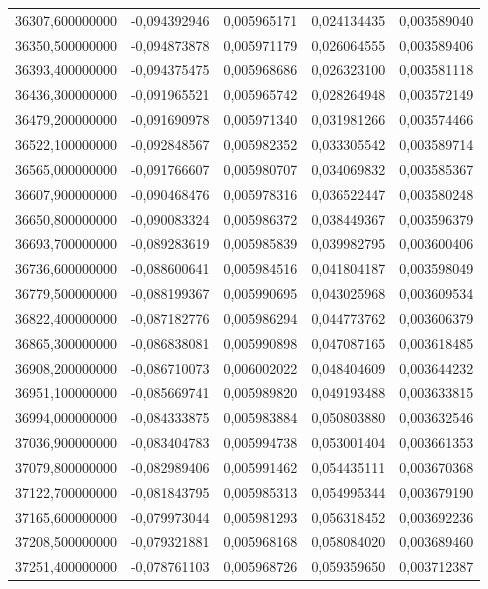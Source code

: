 \begin{longtable}{rrrrr}
36307,600000000 & -0,094392946 & 0,005965171 & 0,024134435 & 0,003589040\\
36350,500000000 & -0,094873878 & 0,005971179 & 0,026064555 & 0,003589406\\
36393,400000000 & -0,094375475 & 0,005968686 & 0,026323100 & 0,003581118\\
36436,300000000 & -0,091965521 & 0,005965742 & 0,028264948 & 0,003572149\\
36479,200000000 & -0,091690978 & 0,005971340 & 0,031981266 & 0,003574466\\
36522,100000000 & -0,092848567 & 0,005982352 & 0,033305542 & 0,003589714\\
36565,000000000 & -0,091766607 & 0,005980707 & 0,034069832 & 0,003585367\\
36607,900000000 & -0,090468476 & 0,005978316 & 0,036522447 & 0,003580248\\
36650,800000000 & -0,090083324 & 0,005986372 & 0,038449367 & 0,003596379\\
36693,700000000 & -0,089283619 & 0,005985839 & 0,039982795 & 0,003600406\\
36736,600000000 & -0,088600641 & 0,005984516 & 0,041804187 & 0,003598049\\
36779,500000000 & -0,088199367 & 0,005990695 & 0,043025968 & 0,003609534\\
36822,400000000 & -0,087182776 & 0,005986294 & 0,044773762 & 0,003606379\\
36865,300000000 & -0,086838081 & 0,005990898 & 0,047087165 & 0,003618485\\
36908,200000000 & -0,086710073 & 0,006002022 & 0,048404609 & 0,003644232\\
36951,100000000 & -0,085669741 & 0,005989820 & 0,049193488 & 0,003633815\\
36994,000000000 & -0,084333875 & 0,005983884 & 0,050803880 & 0,003632546\\
37036,900000000 & -0,083404783 & 0,005994738 & 0,053001404 & 0,003661353\\
37079,800000000 & -0,082989406 & 0,005991462 & 0,054435111 & 0,003670368\\
37122,700000000 & -0,081843795 & 0,005985313 & 0,054995344 & 0,003679190\\
37165,600000000 & -0,079973044 & 0,005981293 & 0,056318452 & 0,003692236\\
37208,500000000 & -0,079321881 & 0,005968168 & 0,058084020 & 0,003689460\\
37251,400000000 & -0,078761103 & 0,005968726 & 0,059359650 & 0,003712387\\

\end{longtable}
